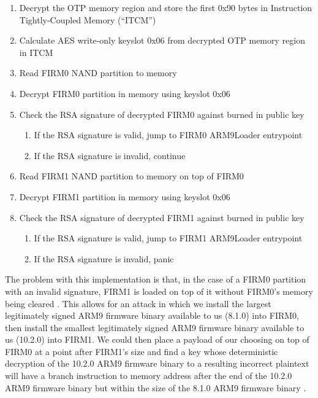 \documentclass[journal]{IEEEtran}
\begin{document}
\medskip
\begin{enumerate}
  \item Decrypt the OTP memory region and store the first 0x90 bytes in
  Instruction Tightly-Coupled Memory (``ITCM'')
  \item Calculate AES write-only keyslot 0x06 from decrypted OTP memory region
  in ITCM
  \item Read FIRM0 NAND partition to memory
  \item Decrypt FIRM0 partition in memory using keyslot 0x06
  \item Check the RSA signature of decrypted FIRM0 against burned in public key
    \begin{enumerate}
    \item If the RSA signature is valid, jump to FIRM0 ARM9Loader entrypoint
    \item If the RSA signature is invalid, continue
    \end{enumerate}
  \item Read FIRM1 NAND partition to memory on top of FIRM0
  \item Decrypt FIRM1 partition in memory using keyslot 0x06
  \item Check the RSA signature of decrypted FIRM1 against burned in public key
    \begin{enumerate}
    \item If the RSA signature is valid, jump to FIRM1 ARM9Loader entrypoint
    \item If the RSA signature is invalid, panic
    \end{enumerate}
\end{enumerate}
\medskip

The problem with this implementation is that, in the case of a FIRM0 partition
with an invalid signature, FIRM1 is loaded on top of it without FIRM0's memory
being cleared \cite{32c3}. This allows for an attack in which we install the
largest legitimately signed ARM9 firmware binary available to us (8.1.0) into
FIRM0, then install the smallest legitimately signed ARM9 firmware binary
available to us (10.2.0) into FIRM1. We could then place a payload of our
choosing on top of FIRM0 at a point after FIRM1's size and find a key whose
deterministic decryption of the 10.2.0 ARM9 firmware binary to a resulting
incorrect plaintext will have a branch instruction to memory address after the
end of the 10.2.0 ARM9 firmware binary but within the size of the 8.1.0 ARM9
firmware binary \cite{32c3}.
\end{document}
